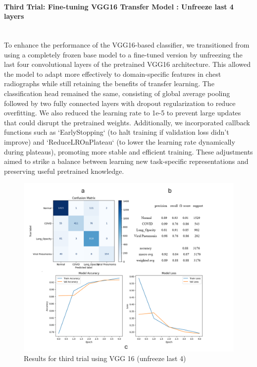 \documentclass{article}
\begin{document}
\paragraph{Third Trial: Fine-tuning VGG16 Transfer Model : Unfreeze last 4 layers}\mbox{}\\
To enhance the performance of the VGG16-based classifier, we transitioned from using a completely frozen base model to a fine-tuned version by unfreezing the last four convolutional layers of the pretrained VGG16 architecture. This allowed the model to adapt more effectively to domain-specific features in chest radiographs while still retaining the benefits of transfer learning. The classification head remained the same, consisting of global average pooling followed by two fully connected layers with dropout regularization to reduce overfitting. We also reduced the learning rate to 1e-5 to prevent large updates that could disrupt the pretrained weights. Additionally, we incorporated callback functions such as `EarlyStopping` (to halt training if validation loss didn't improve) and `ReduceLROnPlateau` (to lower the learning rate dynamically during plateaus), promoting more stable and efficient training. These adjustments aimed to strike a balance between learning new task-specific representations and preserving useful pretrained knowledge.
\begin{figure}[h!] %
    \centering
    \includegraphics[width=1.0\linewidth]{vgg16-4.png}
    \caption{Results for third trial using VGG 16 (unfreeze last 4)}
    \label{fig:vgg16result2.png}
\end{figure}
\end{document}
